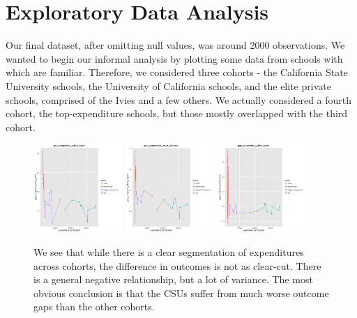 \documentclass{article}
\begin{document}




\section{Exploratory Data Analysis}

Our final dataset, after omitting null values, was around 2000 observations. We wanted to begin our informal analysis by plotting some data from schools with which are familiar. Therefore, we considered three cohorts - the California State University schools, the University of California schools, and the elite private schools, comprised of the Ivies and a few others. We actually considered a fourth cohort, the top-expenditure schools, but those mostly overlapped with the third cohort.



\begin{figure}[H]
\centering
\includegraphics[width=0.3\textwidth]{../images/eda_scatterplots/gap_completion_white_black_cohort.png}
\includegraphics[width=0.3\textwidth]{../images/eda_scatterplots/gap_completion_white_hispanic_cohort.png}
\includegraphics[width=0.3\textwidth]{../images/eda_scatterplots/gap_completion_white_asian_cohort.png}
\caption{\label{fig: CompletionRatesCohorts} We see that while there is a clear segmentation of expenditures across cohorts, the difference in outcomes is not as clear-cut. There is a general negative relationship, but a lot of variance. The most obvious conclusion is that the CSUs suffer from much worse outcome gaps than the other cohorts.}
\end{figure}
\end{document}
